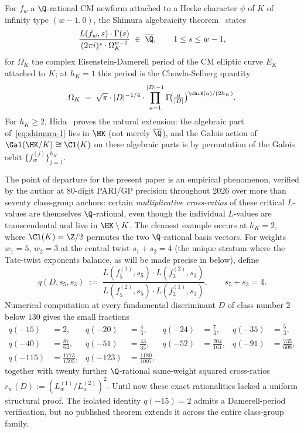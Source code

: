 For $f_w$ a $\Q$-rational CM newform attached to a Hecke character
$\psi$ of $K$ of infinity type $(w-1, 0)$, the Shimura algebraicity
theorem~\cite{Shimura1976} states
\begin{equation}\label{eq:shimura-1}
\frac{L(f_w, s) \cdot \Gamma(s)}{(2\pi i)^s \cdot \Omega_K^{w-1}}
\;\in\; \overline{\Q}, \qquad 1 \leq s \leq w-1,
\end{equation}
for $\Omega_K$ the complex Eisenstein-Damerell period of the CM
elliptic curve $E_K$ attached to $K$; at $h_K = 1$ this period is
the Chowla-Selberg quantity~\cite{ChowlaSelberg1949}
\begin{equation}\label{eq:chowla-selberg}
\Omega_K \;=\; \sqrt{\pi} \cdot |D|^{-1/4} \cdot
\prod_{a=1}^{|D|-1} \Gamma\!\bigl(\tfrac{a}{|D|}\bigr)^{\chiK(a)/(2h_K)}.
\end{equation}
For $h_K \geq 2$, Hida~\cite{Hida1981} proves the natural
extension: the algebraic part of~\eqref{eq:shimura-1} lies in
$\HK$ (not merely $\overline{\Q}$), and the Galois action of
$\Gal(\HK/K) \cong \Cl(K)$ on these algebraic parts is by
permutation of the Galois orbit $\{f_w^{(j)}\}_{j=1}^{h_K}$.

The point of departure for the present paper is an empirical
phenomenon, verified by the author at $80$-digit PARI/GP precision
throughout 2026 over more than seventy class-group anchors: certain
\emph{multiplicative cross-ratios} of these critical $L$-values are
themselves $\Q$-rational, even though the individual $L$-values are
transcendental and live in $\HK \setminus K$. The cleanest example
occurs at $h_K = 2$, where $\Cl(K) = \Z/2$ permutes the two
$\Q$-rational basis vectors. For weights $w_1 = 5$, $w_2 = 3$ at
the central twist $s_1 + s_2 = 4$ (the unique stratum where the
Tate-twist exponents balance, as will be made precise in
 below), define
\begin{equation}\label{eq:q-canonical}
q(D, s_5, s_3) \;:=\;
\frac{L(f_5^{(1)}, s_5) \cdot L(f_3^{(2)}, s_3)}
     {L(f_5^{(2)}, s_5) \cdot L(f_3^{(1)}, s_3)},
\qquad s_5 + s_3 = 4.
\end{equation}
Numerical computation at every fundamental discriminant $D$ of
class number $2$ below $130$ gives the small fractions
\begin{align*}
q(-15) &= 2, & q(-20) &= \tfrac{4}{3}, &
q(-24) &= \tfrac{7}{4}, & q(-35) &= \tfrac{5}{3}, \\
q(-40) &= \tfrac{87}{64}, & q(-51) &= \tfrac{43}{35}, &
q(-52) &= \tfrac{204}{161}, & q(-91) &= \tfrac{735}{608}, \\
q(-115) &= \tfrac{1773}{1595}, &
q(-123) &= \tfrac{1180}{1007},
\end{align*}
together with twenty further $\Q$-rational same-weight squared
cross-ratios $r_w(D) := (L_w^{(1)}/L_w^{(2)})^2$. Until now these
exact rationalities lacked a uniform structural proof. The
isolated identity $q(-15) = 2$ admits a Damerell-period
verification, but no published theorem extends it across the
entire class-group family.

